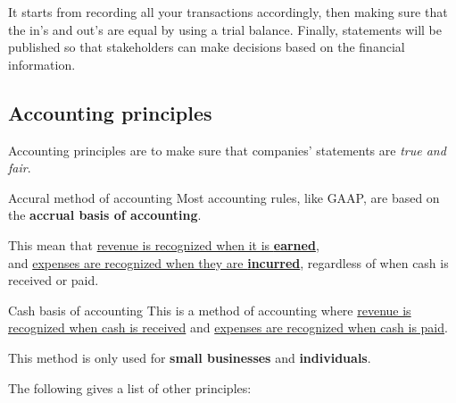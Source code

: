 \begin{center}
\end{center}

It starts from recording all your transactions accordingly, then making sure that the in's and out's are equal by using a trial balance. Finally, statements will be published so that stakeholders can make decisions based on the financial information.

\subsection{Accounting principles}
Accounting principles are to make sure that companies' statements are \textit{true and fair}.
\begin{theorem}
    {Accural method of accounting}
    Most accounting rules, like GAAP, are based on the \textbf{accrual basis of accounting}.
    \vspace{0.5em}

    This mean that \underline{revenue is recognized when it is \textbf{earned}},\\and \underline{expenses are recognized when they are \textbf{incurred}}, regardless of when cash is received or paid.
\end{theorem}
\begin{knBox}
    {Cash basis of accounting}
    This is a method of accounting where \underline{revenue is recognized when cash is received} and \underline{expenses are recognized when cash is paid}.

    This method is only used for \textbf{small businesses} and \textbf{individuals}.
\end{knBox}
The following gives a list of other principles:
